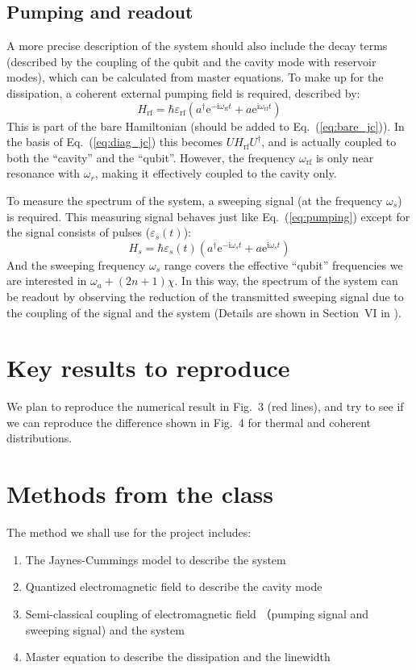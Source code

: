 \documentclass[12pt,notitlepage,nofootinbib]{revtex4-1}
\newcommand{\rf}{\text{rf}}
\newcommand\mi{\mathrm{i}}
\newcommand\e{\mathrm{e}}
\begin{document}
\subsection{Pumping and readout}
A more precise description of the system should also include the decay terms 
(described by the coupling of the qubit and the cavity mode with reservoir 
modes), which can be calculated from master equations. To make up for the dissipation, 
a coherent external pumping field is required, described by:
\begin{equation}\label{eq:pumping}
	H_{\rf} = \hbar \varepsilon_{\rf}(a^\dag\e^{-\mi\omega_{\rf} t} + 
	a\e^{\mi\omega_{\rf} t})
\end{equation}
This is part of the bare Hamiltonian (should be added to Eq.~(\ref{eq:bare_jc})). 
In the basis of Eq.~(\ref{eq:diag_jc}) this becomes $U H_\rf U^\dag$, and is 
actually coupled to both the ``cavity'' and the ``qubit''. However, the 
frequency $\omega_\rf$ is only near resonance with $\omega_r$, making it 
effectively coupled to the cavity only. 

To measure the spectrum of the system, a sweeping signal (at the frequency 
$\omega_s$) is required. This measuring signal behaves just like 
Eq.~(\ref{eq:pumping}) except for the signal consists of pulses ($\varepsilon_s(t)$): 
\begin{equation}\label{eq:sweeping}
	H_{s} = \hbar \varepsilon_{s}(t)(a^\dag\e^{-\mi\omega_{s} t} + 
	a\e^{\mi\omega_{s} t})
\end{equation}
And the sweeping frequency $\omega_s$ range covers the effective ``qubit'' 
frequencies we are interested in $\omega_a + (2n+1)\chi$. In this way, the 
spectrum of the system can be readout by observing the reduction of the 
transmitted sweeping signal due to the coupling of the signal and the system
(Details are shown in Section~VI in \cite{blais2004cavity}).  

\section{Key results to reproduce}
We plan to reproduce the numerical result in Fig.~3 (red lines), 
and try to see if we can reproduce the difference shown in Fig.~4 for thermal 
and coherent distributions. 

\section{Methods from the class}
The method we shall use for the project includes: 
\begin{enumerate}
	\item The Jaynes-Cummings model to describe the system
	\item Quantized electromagnetic field to describe the cavity mode
	\item Semi-classical coupling of electromagnetic field （pumping signal and 
	sweeping signal) and the system
	\item Master equation to describe the dissipation and the linewidth 
\end{enumerate}
\end{document}
